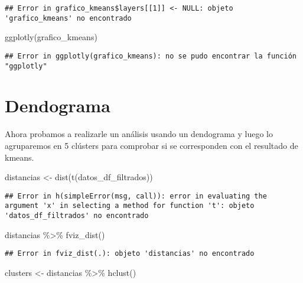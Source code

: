 \documentclass[
]{book}
\newenvironment{Shaded}{\begin{snugshade}}{\end{snugshade}}
\newcommand{\FunctionTok}[1]{\textcolor[rgb]{0.00,0.00,0.00}{#1}}
\newcommand{\NormalTok}[1]{#1}
\newcommand{\OtherTok}[1]{\textcolor[rgb]{0.56,0.35,0.01}{#1}}
\newcommand{\SpecialCharTok}[1]{\textcolor[rgb]{0.00,0.00,0.00}{#1}}
\begin{document}
\begin{verbatim}
## Error in grafico_kmeans$layers[[1]] <- NULL: objeto 'grafico_kmeans' no encontrado
\end{verbatim}

\begin{Shaded}
\begin{Highlighting}[]
\FunctionTok{ggplotly}\NormalTok{(grafico\_kmeans)}
\end{Highlighting}
\end{Shaded}

\begin{verbatim}
## Error in ggplotly(grafico_kmeans): no se pudo encontrar la función "ggplotly"
\end{verbatim}

\hypertarget{dendograma}{%
\section{Dendograma}\label{dendograma}}

Ahora probamos a realizarle un análisis usando un dendograma y luego lo agruparemos en 5 clústers para comprobar si se corresponden con el resultado de kmeans.

\begin{Shaded}
\begin{Highlighting}[]
\NormalTok{distancias }\OtherTok{\textless{}{-}} \FunctionTok{dist}\NormalTok{(}\FunctionTok{t}\NormalTok{(datos\_df\_filtrados))}
\end{Highlighting}
\end{Shaded}

\begin{verbatim}
## Error in h(simpleError(msg, call)): error in evaluating the argument 'x' in selecting a method for function 't': objeto 'datos_df_filtrados' no encontrado
\end{verbatim}

\begin{Shaded}
\begin{Highlighting}[]
\NormalTok{distancias }\SpecialCharTok{\%\textgreater{}\%} \FunctionTok{fviz\_dist}\NormalTok{()}
\end{Highlighting}
\end{Shaded}

\begin{verbatim}
## Error in fviz_dist(.): objeto 'distancias' no encontrado
\end{verbatim}

\begin{Shaded}
\begin{Highlighting}[]
\NormalTok{clusters }\OtherTok{\textless{}{-}}\NormalTok{ distancias }\SpecialCharTok{\%\textgreater{}\%} \FunctionTok{hclust}\NormalTok{()}
\end{Highlighting}
\end{Shaded}
\end{document}
